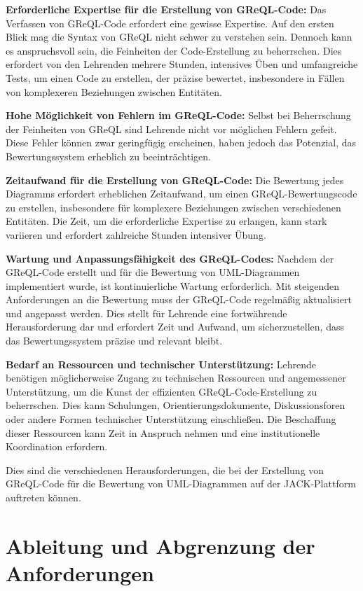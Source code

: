 \textbf{Erforderliche Expertise für die Erstellung von GReQL-Code:} Das Verfassen von GReQL-Code erfordert eine gewisse Expertise. Auf den ersten Blick mag die Syntax von GReQL nicht schwer zu verstehen sein. Dennoch kann es anspruchsvoll sein, die Feinheiten der Code-Erstellung zu beherrschen. Dies erfordert von den Lehrenden mehrere Stunden, intensives Üben und umfangreiche Tests, um einen Code zu erstellen, der präzise bewertet, insbesondere in Fällen von komplexeren Beziehungen zwischen Entitäten.

\textbf{Hohe Möglichkeit von Fehlern im GReQL-Code:} Selbst bei Beherrschung der Feinheiten von GReQL sind Lehrende nicht vor möglichen Fehlern gefeit. Diese Fehler können zwar geringfügig erscheinen, haben jedoch das Potenzial, das Bewertungssystem erheblich zu beeinträchtigen.

\textbf{Zeitaufwand für die Erstellung von GReQL-Code:} Die Bewertung jedes Diagramms erfordert erheblichen Zeitaufwand, um einen GReQL-Bewertungscode zu erstellen, insbesondere für komplexere Beziehungen zwischen verschiedenen Entitäten. Die Zeit, um die erforderliche Expertise zu erlangen, kann stark variieren und erfordert zahlreiche Stunden intensiver Übung.

\textbf{Wartung und Anpassungsfähigkeit des GReQL-Codes:} Nachdem der GReQL-Code erstellt und für die Bewertung von UML-Diagrammen implementiert wurde, ist kontinuierliche Wartung erforderlich. Mit steigenden Anforderungen an die Bewertung muss der GReQL-Code regelmäßig aktualisiert und angepasst werden. Dies stellt für Lehrende eine fortwährende Herausforderung dar und erfordert Zeit und Aufwand, um sicherzustellen, dass das Bewertungssystem präzise und relevant bleibt.

\textbf{Bedarf an Ressourcen und technischer Unterstützung:} Lehrende benötigen möglicherweise Zugang zu technischen Ressourcen und angemessener Unterstützung, um die Kunst der effizienten GReQL-Code-Erstellung zu beherrschen. Dies kann Schulungen, Orientierungsdokumente, Diskussionsforen oder andere Formen technischer Unterstützung einschließen. Die Beschaffung dieser Ressourcen kann Zeit in Anspruch nehmen und eine institutionelle Koordination erfordern.

Dies sind die verschiedenen Herausforderungen, die bei der Erstellung von GReQL-Code für die Bewertung von UML-Diagrammen auf der JACK-Plattform auftreten können.


\section{Ableitung und Abgrenzung der Anforderungen}

